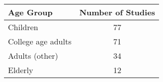 \begin{tabular}{lc}
\hline
Age Group & Number of Studies\\
\hline
Children &77\\
College age adults &71\\
Adults (other) & 34\\
Elderly&12\\
\hline
\end{tabular}
\vspace{-.7cm}